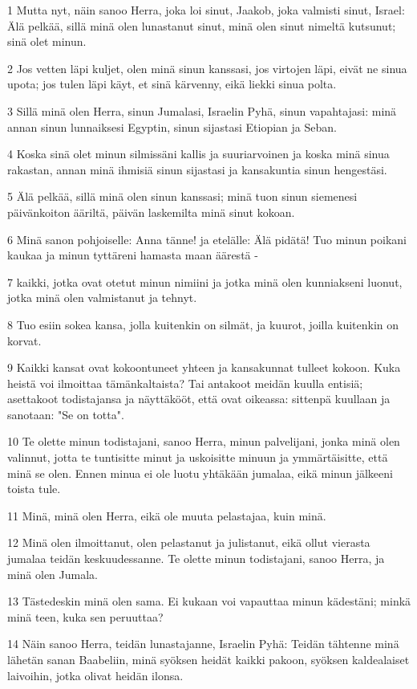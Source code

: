 \par 1 Mutta nyt, näin sanoo Herra, joka loi sinut, Jaakob, joka valmisti sinut, Israel: Älä pelkää, sillä minä olen lunastanut sinut, minä olen sinut nimeltä kutsunut; sinä olet minun.
\par 2 Jos vetten läpi kuljet, olen minä sinun kanssasi, jos virtojen läpi, eivät ne sinua upota; jos tulen läpi käyt, et sinä kärvenny, eikä liekki sinua polta.
\par 3 Sillä minä olen Herra, sinun Jumalasi, Israelin Pyhä, sinun vapahtajasi: minä annan sinun lunnaiksesi Egyptin, sinun sijastasi Etiopian ja Seban.
\par 4 Koska sinä olet minun silmissäni kallis ja suuriarvoinen ja koska minä sinua rakastan, annan minä ihmisiä sinun sijastasi ja kansakuntia sinun hengestäsi.
\par 5 Älä pelkää, sillä minä olen sinun kanssasi; minä tuon sinun siemenesi päivänkoiton ääriltä, päivän laskemilta minä sinut kokoan.
\par 6 Minä sanon pohjoiselle: Anna tänne! ja etelälle: Älä pidätä! Tuo minun poikani kaukaa ja minun tyttäreni hamasta maan äärestä -
\par 7 kaikki, jotka ovat otetut minun nimiini ja jotka minä olen kunniakseni luonut, jotka minä olen valmistanut ja tehnyt.
\par 8 Tuo esiin sokea kansa, jolla kuitenkin on silmät, ja kuurot, joilla kuitenkin on korvat.
\par 9 Kaikki kansat ovat kokoontuneet yhteen ja kansakunnat tulleet kokoon. Kuka heistä voi ilmoittaa tämänkaltaista? Tai antakoot meidän kuulla entisiä; asettakoot todistajansa ja näyttäkööt, että ovat oikeassa: sittenpä kuullaan ja sanotaan: "Se on totta".
\par 10 Te olette minun todistajani, sanoo Herra, minun palvelijani, jonka minä olen valinnut, jotta te tuntisitte minut ja uskoisitte minuun ja ymmärtäisitte, että minä se olen. Ennen minua ei ole luotu yhtäkään jumalaa, eikä minun jälkeeni toista tule.
\par 11 Minä, minä olen Herra, eikä ole muuta pelastajaa, kuin minä.
\par 12 Minä olen ilmoittanut, olen pelastanut ja julistanut, eikä ollut vierasta jumalaa teidän keskuudessanne. Te olette minun todistajani, sanoo Herra, ja minä olen Jumala.
\par 13 Tästedeskin minä olen sama. Ei kukaan voi vapauttaa minun kädestäni; minkä minä teen, kuka sen peruuttaa?
\par 14 Näin sanoo Herra, teidän lunastajanne, Israelin Pyhä: Teidän tähtenne minä lähetän sanan Baabeliin, minä syöksen heidät kaikki pakoon, syöksen kaldealaiset laivoihin, jotka olivat heidän ilonsa.
